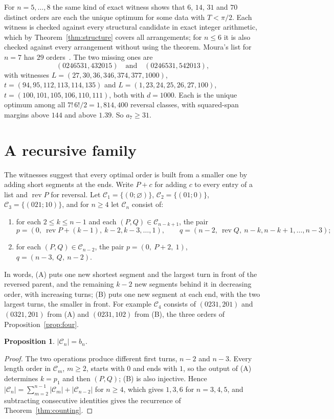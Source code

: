 \documentclass[11pt]{article}
\newtheorem{proposition}[lemma]{Proposition}
\theoremstyle{remark}
\newcommand{\cC}{\mathcal C}
\DeclareMathOperator{\rev}{rev}
\begin{document}
For $n=5,\dots,8$ the same kind of exact witness shows that $6$, $14$, $31$ and $70$ distinct orders are each the unique optimum for some data with $T<\pi/2$. Each witness is checked against every structural candidate in exact integer arithmetic, which by Theorem~\ref{thm:structure} covers all arrangements; for $n\le6$ it is also checked against every arrangement without using the theorem. Moura's list for $n=7$ has $29$ orders~\cite{moura}. The two missing ones are
\[
(0246531,432015)\quad\text{and}\quad(0246531,542013),
\]
with witnesses $L=(27,30,36,346,374,377,1000)$, $t=(94,95,112,113,114,135)$ and $L=(1,23,24,25,26,27,100)$, $t=(100,101,105,106,110,111)$, both with $d=1000$. Each is the unique optimum among all $7!\,6!/2=1{,}814{,}400$ reversal classes, with squared-span margins above $144$ and above $1.39$. So $a_7\ge31$.

\section{A recursive family}\label{sec:family}

The witnesses suggest that every optimal order is built from a smaller one by adding short segments at the ends. Write $P+c$ for adding $c$ to every entry of a list and $\rev P$ for reversal. Let $\cC_1=\{(0;\varnothing)\}$, $\cC_2=\{(01;0)\}$, $\cC_3=\{(021;10)\}$, and for $n\ge4$ let $\cC_n$ consist of:
\begin{enumerate}
\item[(A)] for each $2\le k\le n-1$ and each $(P,Q)\in\cC_{n-k+1}$, the pair
\[
p=(0,\ \rev P+(k-1),\ k-2,k-3,\dots,1),\qquad q=(n-2,\ \rev Q,\ n-k,n-k+1,\dots,n-3);
\]
\item[(B)] for each $(P,Q)\in\cC_{n-2}$, the pair $p=(0,\ P+2,\ 1)$, $q=(n-3,\ Q,\ n-2)$.
\end{enumerate}
In words, (A) puts one new shortest segment and the largest turn in front of the reversed parent, and the remaining $k-2$ new segments behind it in decreasing order, with increasing turns; (B) puts one new segment at each end, with the two largest turns, the smaller in front. For example $\cC_4$ consists of $(0231,201)$ and $(0321,201)$ from (A) and $(0231,102)$ from (B), the three orders of Proposition~\ref{prop:four}.

\begin{proposition}\label{prop:count}
$|\cC_n|=b_n$.
\end{proposition}

\begin{proof}
The two operations produce different first turns, $n-2$ and $n-3$. Every length order in $\cC_m$, $m\ge2$, starts with $0$ and ends with $1$, so the output of (A) determines $k=p_1$ and then $(P,Q)$; (B) is also injective. Hence $|\cC_n|=\sum_{m=2}^{n-1}|\cC_m|+|\cC_{n-2}|$ for $n\ge4$, which gives $1,3,6$ for $n=3,4,5$, and subtracting consecutive identities gives the recurrence of Theorem~\ref{thm:counting}.
\end{proof}
\end{document}
